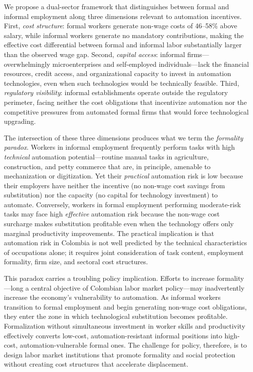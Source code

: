\documentclass{article}
\begin{document}
We propose a dual-sector framework that distinguishes between formal and informal employment along three dimensions relevant to automation incentives. First, \textit{cost structure}: formal workers generate non-wage costs of 46--58\% above salary, while informal workers generate no mandatory contributions, making the effective cost differential between formal and informal labor substantially larger than the observed wage gap. Second, \textit{capital access}: informal firms---overwhelmingly microenterprises and self-employed individuals---lack the financial resources, credit access, and organizational capacity to invest in automation technologies, even when such technologies would be technically feasible. Third, \textit{regulatory visibility}: informal establishments operate outside the regulatory perimeter, facing neither the cost obligations that incentivize automation nor the competitive pressures from automated formal firms that would force technological upgrading.

The intersection of these three dimensions produces what we term the \textit{formality paradox}. Workers in informal employment frequently perform tasks with high \textit{technical} automation potential---routine manual tasks in agriculture, construction, and petty commerce that are, in principle, amenable to mechanization or digitization. Yet their \textit{practical} automation risk is low because their employers have neither the incentive (no non-wage cost savings from substitution) nor the capacity (no capital for technology investment) to automate. Conversely, workers in formal employment performing moderate-risk tasks may face high \textit{effective} automation risk because the non-wage cost surcharge makes substitution profitable even when the technology offers only marginal productivity improvements. The practical implication is that automation risk in Colombia is not well predicted by the technical characteristics of occupations alone; it requires joint consideration of task content, employment formality, firm size, and sectoral cost structures.

This paradox carries a troubling policy implication. Efforts to increase formality---long a central objective of Colombian labor market policy---may inadvertently increase the economy's vulnerability to automation. As informal workers transition to formal employment and begin generating non-wage cost obligations, they enter the zone in which technological substitution becomes profitable. Formalization without simultaneous investment in worker skills and productivity effectively converts low-cost, automation-resistant informal positions into high-cost, automation-vulnerable formal ones. The challenge for policy, therefore, is to design labor market institutions that promote formality and social protection without creating cost structures that accelerate displacement.
\end{document}
